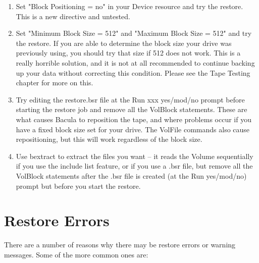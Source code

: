 \begin{enumerate}
\item Set "Block Positioning = no" in your Device resource  and try the
   restore. This is a new directive and untested. 

\item Set "Minimum Block Size = 512" and "Maximum  Block Size = 512" and
   try the restore.  If you are able to determine the block size your drive
   was previously using, you should try that size if 512 does not work.
   This is a really horrible solution, and it is not at all recommended
   to continue backing up your data without correcting this condition.
   Please see the Tape Testing chapter for more on this.

\item Try editing the restore.bsr file at the Run xxx yes/mod/no prompt 
   before starting the restore job and remove all the VolBlock statements.
   These are what causes Bacula to reposition the tape, and where problems
   occur if you have a fixed block size set for your drive.  The VolFile
   commands also cause repositioning, but this will work regardless of the
   block size.

\item Use bextract to extract the files you want -- it reads the  Volume
   sequentially if you use the include list feature, or if you use a .bsr
   file, but remove all the VolBlock statements after the .bsr file is
   created (at the Run yes/mod/no) prompt but before you start the restore.
\end{enumerate}

\section{Restore Errors}

There are a number of reasons why there may be restore errors or
warning messages. Some of the more common ones are:

